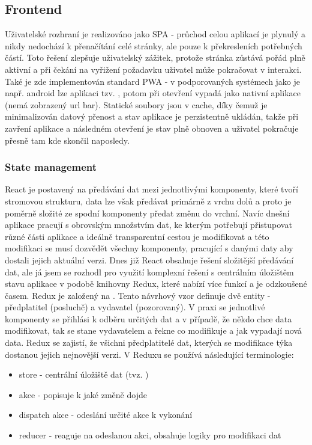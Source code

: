 \subsection{Frontend}
Uživatelské rozhraní je realizováno jako SPA - průchod celou aplikací je plynulý a nikdy nedochází k přenačítání celé stránky, ale pouze k překresleních potřebných částí. Toto řešení zlepšuje uživatelský zážitek, protože stránka zůstává pořád plně aktivní a při čekání na vyřižení požadavku uživatel může pokračovat v interakci. Také je zde implementován standard PWA - v podporovaných systémech jako je např. android lze aplikaci tzv. , potom při otevření vypadá jako nativní aplikace (nemá zobrazený url bar). Statické soubory jsou v cache, díky čemuž je minimalizován datový přenost a stav aplikace je perzistentně ukládán, takže při zavření aplikace a následném otevření je stav plně obnoven a uživatel pokračuje přesně tam kde skončil naposledy.

\subsubsection{State management}%
React je postavený na předávání dat mezi jednotlivými komponenty, které tvoří stromovou strukturu, data lze však předávat primárně z vrchu dolů a proto je poměrně složité ze spodní komponenty předat změnu do vrchní. Navíc dnešní aplikace pracují s obrovským množstvím dat, ke kterým potřebují přistupovat různé části aplikace a ideálně transparentní cestou je modifikovat a této modifikaci se musí dozvědět všechny komponenty, pracující s danými daty aby dostali jejich aktuální verzi. Dnes již React obsahuje řešení složitější předávání dat, ale já jsem se rozhodl pro využití komplexní řešení s centrálním úložištěm stavu aplikace v podobě knihovny Redux, které nabízí více funkcí a je odzkoušené časem. Redux je založený na . Tento návrhový vzor definuje dvě entity - předplatitel (posluchč) a vydavatel (pozorovaný). V praxi se jednotlivé komponenty se přihlási k odběru určitých dat  a v případě, že někdo chce data modifikovat, tak se stane vydavatelem a řekne co modifikuje a jak vypadají nová data. Redux se zajistí, že všichni předplatitelé dat, kterých se modifikace týka dostanou jejich nejnovější verzi. V Reduxu se používá následující terminologie:
\begin{itemize}
    \item store - centrální úložiště dat (tvz. )
    \item akce - popisuje k jaké změně dojde
    \item dispatch akce - odeslání určité akce k vykonání
    \item reducer - reaguje na odeslanou akci, obsahuje logiky pro modifikaci dat
\end{itemize}

